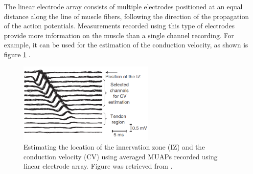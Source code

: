 The linear electrode array consists of multiple electrodes positioned at an equal distance along the line of muscle fibers, following the direction of the propagation of the action potentials. Measurements recorded using this type of electrodes provide more information on the muscle than a single channel recording. For example, it can be used for the estimation of the conduction velocity, as shown is figure \ref{fig:conduction_velocity} \citep{Merletti-book}.
\begin{figure}[ht]
\centering
\includegraphics[width=0.60\textwidth]{Images/introduction/conduction_velocity.png}
\caption{Estimating the location of the innervation zone (IZ) and the conduction velocity (CV) using averaged MUAPs recorded using linear electrode array. Figure was retrieved from \citet{Merletti-book}.}
\label{fig:conduction_velocity}
\end{figure}

